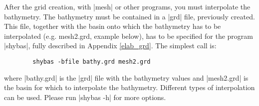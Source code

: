 
%
%
%
%
%
%
%

After the grid creation, with |mesh| or other programs, you must interpolate the
bathymetry.
The bathymetry must be contained in a |grd| file, previously created.
This file, together with the basin onto which the bathymetry has to be 
interpolated (e.g. mesh2.grd, example below), has to be specified for the program |shybas|, fully 
described in Appendix \ref{elab_grd}.
The simplest call is: 

\begin{verbatim}
        shybas -bfile bathy.grd mesh2.grd
\end{verbatim}

where |bathy.grd| is the |grd| file with the bathymetry values and
|mesh2.grd| is the basin for which to interpolate the bathymetry.
Different types of interpolation can be used. Please run
|shybas -h| for more options.



%


